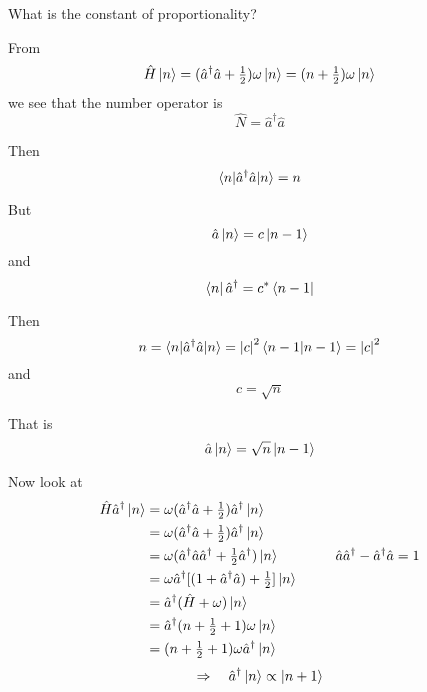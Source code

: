 \documentclass{article}
\begin{document}
\noindent What is the constant of proportionality?


\noindent From
\begin{equation*}
\hat{H} \ket{n} = ( \hat{a}^\dagger \hat{a} + \tfrac{1}{2} ) \omega \ket{n} = ( n + \tfrac{1}{2} ) \omega \ket{n}
\end{equation*}
we see that the number operator is
\begin{equation*}
\hat{N} = \hat{a}^\dagger \hat{a}
\end{equation*}

\noindent Then
\begin{equation*}
\braket{ n | \hat{a}^\dagger \hat{a} | n } = n
\end{equation*}

\noindent But
\begin{equation*}
\hat{a} \ket{n} = c \ket{n-1}
\end{equation*}
and
\begin{equation*}
\bra{n} \hat{a}^\dagger = c^* \bra{n-1}
\end{equation*}

\noindent Then
\begin{equation*}
n = \braket{ n | \hat{a}^\dagger \hat{a} | n } = {|c|}^2 \braket{ n-1 | n-1 } = {|c|}^2
\end{equation*}
and
\begin{equation*}
c = \sqrt{n}
\end{equation*}


\noindent That is
\begin{equation*}
\hat{a} \ket{n} = \sqrt{n} \ket{n-1}
\end{equation*}

\noindent Now look at
\begin{align*}
\hat{H} \hat{a}^\dagger \ket{n} &= \omega ( \hat{a}^\dagger \hat{a} + \tfrac{1}{2} ) \hat{a}^\dagger \ket{n} \\
&= \omega ( \hat{a}^\dagger \hat{a} + \tfrac{1}{2} ) \hat{a}^\dagger \ket{n} \\
&= \omega ( \hat{a}^\dagger \hat{a} \hat{a}^\dagger + \tfrac{1}{2} \hat{a}^\dagger ) \ket{n} \qquad \qquad \hat{a} \hat{a}^\dagger - \hat{a}^\dagger \hat{a} = 1 \\
&= \omega \hat{a}^\dagger [ ( 1 + \hat{a}^\dagger \hat{a} ) + \tfrac{1}{2} ] \ket{n} \\
&= \hat{a}^\dagger ( \hat{H} + \omega ) \ket{n} \\
&= \hat{a}^\dagger ( n + \tfrac{1}{2} + 1 ) \omega \ket{n} \\
&= ( n + \tfrac{1}{2} + 1 ) \omega \hat{a}^\dagger \ket{n}
\end{align*}
\begin{equation*}
\Rightarrow \quad \hat{a}^\dagger \ket{n} \propto \ket{n+1}
\end{equation*}
\end{document}
